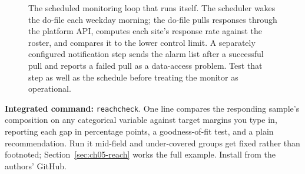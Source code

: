 \documentclass[
    a4paper,
    fontsize=10pt,
    twoside=true,
    numbers=noenddot,
]{kaobook}
\begin{document}
\begin{figure}[htbp]
\centering
{}
\caption[The scheduled monitoring loop]{The scheduled monitoring loop that runs itself. The scheduler wakes the do-file each weekday morning; the do-file pulls responses through the platform API, computes each site's response rate against the roster, and compares it to the lower control limit. A separately configured notification step sends the alarm list after a successful pull and reports a failed pull as a data-access problem. Test that step as well as the schedule before treating the monitor as operational.}
\label{fig:ch05-viz-cronloop}
\end{figure}

\begin{kaobox}[frametitle=Package Integration: \texttt{reachcheck}]
\textbf{Integrated command:} \texttt{reachcheck}. One line compares the responding sample's composition on any categorical variable against target margins you type in, reporting each gap in percentage points, a goodness-of-fit test, and a plain recommendation. Run it mid-field and under-covered groups get fixed rather than footnoted; Section~\ref{sec:ch05-reach} works the full example. Install from the authors' GitHub.
\end{kaobox}
\end{document}
